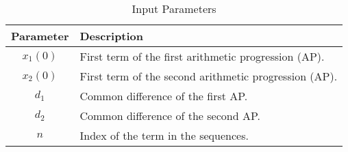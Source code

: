\documentclass{article}
\begin{document}
\begin{table}[htbp]
    \centering
    \caption{Input Parameters}
    \begin{tabular}{|c|p{6cm}|}
    \hline
    \textbf{Parameter} & \textbf{Description} \\
    \hline
    \( x_1(0) \) & First term of the first arithmetic progression (AP). \\
    \( x_2(0) \) & First term of the second arithmetic progression (AP). \\
    \( d_1 \) & Common difference of the first AP. \\
    \( d_2 \) & Common difference of the second AP. \\
    \( n \) & Index of the term in the sequences. \\
    \hline
    \end{tabular}
    \label{tab:parameters}
\end{table}
\end{document}

